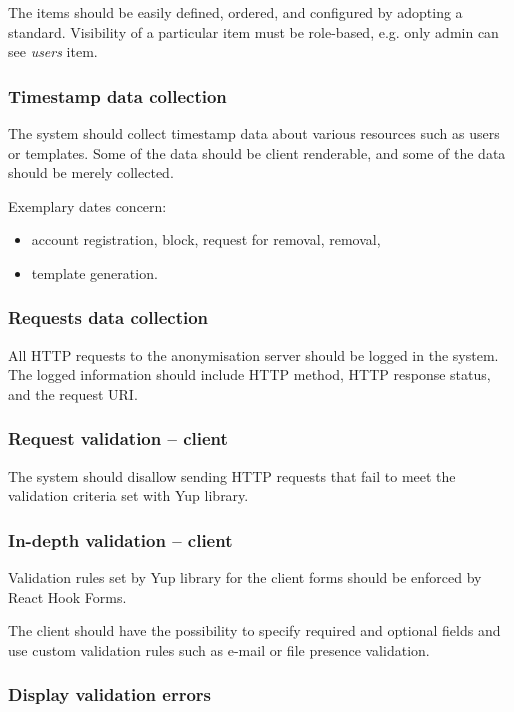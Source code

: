 \documentclass[a4paper,twoside,12pt]{book}
\begin{document}
The items should be easily defined, ordered, and configured by adopting a standard. Visibility of a particular item must be role-based, e.g. only admin can see \textit{users} item.

\subsubsection{Timestamp data collection}

The system should collect timestamp data about various resources such as users or templates. Some of the data should be client renderable, and some of the data should be merely collected.

Exemplary dates concern:
\begin{itemize}
\item account registration, block, request for removal, removal,
\item template generation.
\end{itemize}

\subsubsection{Requests data collection}

All HTTP requests to the anonymisation server should be logged in the system. The logged information should include HTTP method, HTTP response status, and the request URI.	

\subsubsection{Request validation – client}

The system should disallow sending HTTP requests that fail to meet the validation criteria set with Yup library.

\subsubsection{In-depth validation – client}

Validation rules set by Yup library for the client forms should be enforced by React Hook Forms. 

The client should have the possibility to specify required and optional fields and use custom validation rules such as e-mail or file presence validation.

\subsubsection{Display validation errors}
\end{document}
